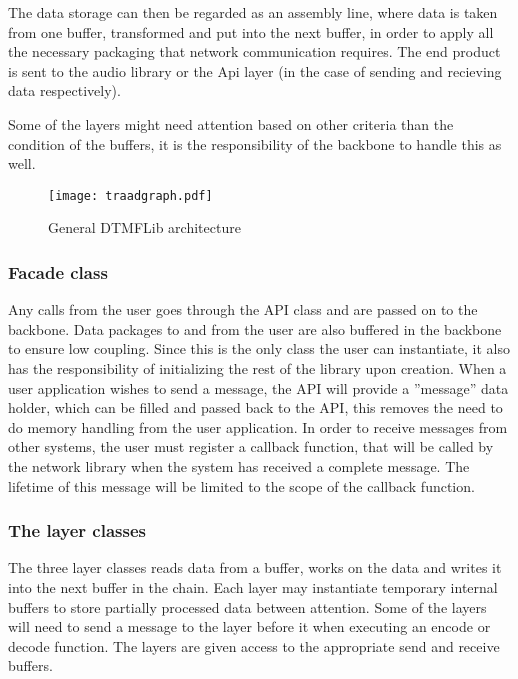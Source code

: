 The data storage can then be regarded as an assembly line, where data is taken from one buffer, transformed and put into the next buffer, in order to apply all the necessary packaging that network communication requires. The end product  is sent to the audio library or the Api layer (in the case of sending and recieving data respectively).

Some of the layers might need attention based on other criteria than the condition of the buffers, it is the responsibility of the backbone to handle this as well.

\begin{figure}[htb]
	\begin{center}
	\texttt{[image: traadgraph.pdf]}
	\caption{General DTMFLib architecture}
	\label{fig:general_architecture}	
	\end{center}
\end{figure}

\subsubsection{Facade class}
Any calls from the user goes through the API class and are passed on to the backbone. Data packages to and from the user are also buffered in the backbone to ensure low coupling. Since this is the only class the user can instantiate, it also has the responsibility of initializing the rest of the library upon creation.
When a user application wishes to send a message, the API will provide a ''message'' data holder, which can be filled and passed back to the API, this removes the need to do memory handling from the user application.
In order to receive messages from other systems, the user must register a callback function, that will be called by the network library when the system has received a complete message. The lifetime of this message will be limited to the scope of the callback function.

\subsubsection{The layer classes}
The three layer classes reads data from a buffer, works on the data and writes it into the next buffer in the chain. Each layer may instantiate temporary internal buffers to store partially processed data between attention. Some of the layers will need to send a message to the layer before it when executing an encode or decode function. The layers are given access to the appropriate send and receive buffers.


